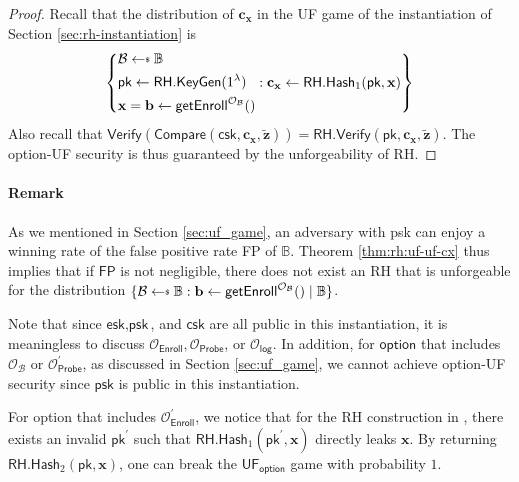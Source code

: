 \begin{proof}

Recall that the distribution of $\mathbf{c_x}$ in the \textsf{UF} game of the instantiation of Section \ref{sec:rh-instantiation} is
\[
	\left \{
		\begin{aligned} 
			 & \mathcal{B} \getsdollar \mathbb{B} \\
			 & \textsf{pk} \gets \textsf{RH.KeyGen}(1^\lambda) \\
			 & \mathbf{x} = \mathbf{b} \gets \textsf{getEnroll}^{\mathcal{O}_\mathcal{B}}() 
		\end{aligned} :
		\mathbf{c_x} \gets \textsf{RH.Hash}_1(\textsf{pk}, \mathbf{x})
	\right \}
\]
Also recall that $\textsf{Verify}(\textsf{Compare}(\textsf{csk}, \mathbf{c_x}, \mathbf{\tilde{z}} )) = \textsf{RH.Verify}(\textsf{pk}, \mathbf{c_x}, \mathbf{\tilde{z}} )$.
The \textsf{option}-UF security is thus guaranteed by the unforgeability of \textsf{RH}.

\end{proof}

\paragraph{Remark}
As we mentioned in Section \ref{sec:uf_game}, an adversary with \textsf{psk} can enjoy a winning rate of the false positive rate \textsf{FP} of $\mathbb{B}$. Theorem \ref{thm:rh:uf-uf-cx} thus implies that if $\textsf{FP}$ is not negligible, there does not exist an \textsf{RH} that is unforgeable for the distribution $\{ \mathcal{B} \getsdollar \mathbb{B}: \mathbf{b} \gets {\sf getEnroll}^{\mathcal{O}_\mathcal{B}}() \mid \mathbb{B} \}$.


Note that since $\textsf{esk}, \textsf{psk}$, and $ \textsf{csk}$ are all public in this instantiation, it is meaningless to discuss $\mathcal{O}_\textsf{Enroll}, \mathcal{O}_\textsf{Probe}$, or $\mathcal{O}_\textsf{log}$. In addition, for $\textsf{option}$ that includes $\mathcal{O}_\mathcal{B}$ or $\mathcal{O}_\textsf{Probe}^\prime$, as discussed in Section \ref{sec:uf_game}, we cannot achieve \textsf{option}-UF security since $\textsf{psk}$ is public in this instantiation.

For \textsf{option} that includes $\mathcal{O}_\textsf{Enroll}^\prime$, we notice that for the \textsf{RH} construction in \cite{cryptoeprint:2014/394}, there exists an invalid $\textsf{pk}^\prime$ such that $\textsf{RH.Hash}_1(\textsf{pk}^\prime, \mathbf{x})$ directly leaks $\mathbf{x}$. By returning $\textsf{RH.Hash}_2( \textsf{pk}, \mathbf{x} )$, one can break the $\textsf{UF}_{\textsf{option}}$ game with probability $1$.


